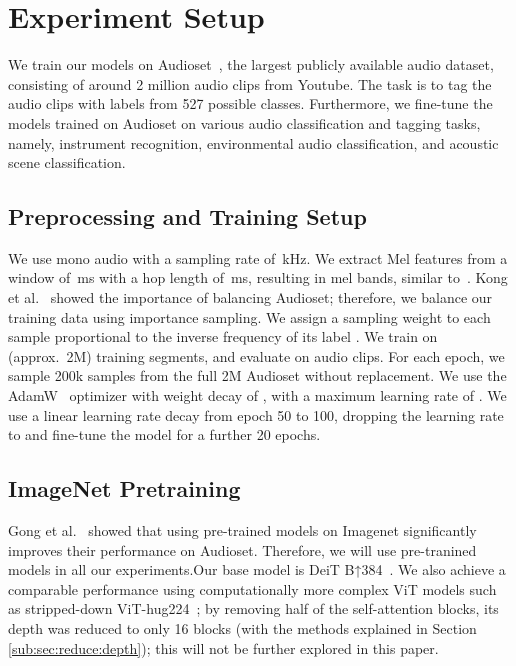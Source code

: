 \documentclass[a4paper]{article}
\begin{document}
\section{Experiment Setup}
\label{sec:setup}

We train our models on Audioset~\cite{audioset2017Gemmeke}, the largest publicly available audio dataset, consisting of around 2 million audio clips from Youtube. The task is to tag the audio clips with labels from 527 possible classes. Furthermore, we fine-tune the models trained on Audioset on various audio classification and tagging tasks, namely, instrument recognition, environmental audio classification, and acoustic scene classification.  


\subsection{Preprocessing and Training Setup}
\label{sec:preprocessing}
We use mono audio with a sampling rate of \,kHz. We extract Mel features from a window of \,ms with a hop length of \,ms, resulting in  mel bands, similar to~\cite{gong21ast}. Kong et al.~\cite{KongCIWWP20panns} showed the importance of balancing Audioset; therefore, we balance our training data using importance sampling. We assign a sampling weight to each sample proportional to the inverse frequency of its label . We train on  (approx.\ 2M) training segments, and evaluate on  audio clips. For each epoch, we sample 200k samples from the full 2M Audioset without replacement.
We use the AdamW~\cite{LoshchilovH19adamw} optimizer with weight decay of , with a maximum learning rate of . We use a linear learning rate decay from epoch 50 to 100, dropping the learning rate to  and fine-tune the model for a further 20 epochs.

\subsection{ImageNet Pretraining}
\label{sec:imageNet}

Gong et al.~\cite{gong21ast} showed that using pre-trained models on Imagenet significantly improves their performance on Audioset. Therefore, we will use pre-tranined models in all our experiments.Our base model is DeiT B↑384~\cite{TouvronCDMSJ21deit}. 
We also achieve a comparable performance using computationally more complex ViT models such as stripped-down ViT-hug224~\cite{dosovitskiyB0WZ21VIT}; by removing half of the self-attention blocks, its depth was reduced to only 16 blocks (with the methods explained in Section \ref{sub:sec:reduce:depth}); this will not be further explored in this paper.
\end{document}
